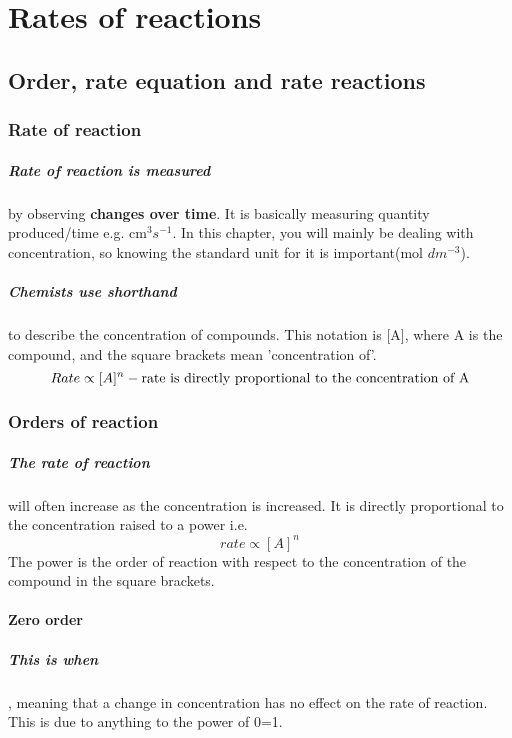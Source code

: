 \chapter{Rates of reactions}
\section{Order, rate equation and rate reactions}
\subsection{Rate of reaction}
\paragraph{Rate of reaction is measured} by observing \textbf{changes over time}. It is basically measuring quantity produced/time e.g. cm$^3 s^{-1} $. In this chapter, you will mainly be dealing with concentration, so knowing the standard unit for it is important(mol $ dm^{-3}$).
\paragraph{Chemists use shorthand} to describe the concentration of compounds. This notation is [A], where A is the compound, and the square brackets mean 'concentration of'.
\begin{equation}
Rate \propto [A]^n - \textnormal{rate is directly proportional to the concentration of A}
\end{equation}
\subsection{Orders of reaction}
\paragraph{The rate of reaction}will often increase as the concentration is increased. It is directly proportional to the concentration raised to a power i.e.
\begin{equation}
rate\propto [A]^n
\end{equation}
The power is the order of reaction with respect to the concentration of the compound in the square brackets.
\subsubsection{Zero order}
\paragraph{This is when}, meaning that a change in concentration has no effect on the rate of reaction. This is due to anything to the power of 0=1. 
